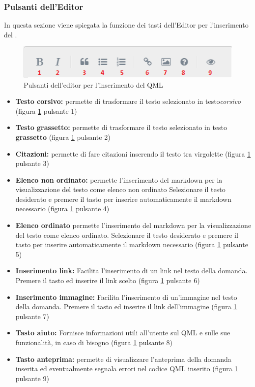\documentclass[12pt,a4paper]{article}
\begin{document}
	\subsubsection{Pulsanti dell'Editor}
	In questa sezione viene spiegata la funzione dei tasti dell'Editor per l'inserimento del .
	\begin{figure}[H]	
		\centering
		\includegraphics[width=\linewidth]{../img/screenshot/simpleMDEMenu.png}
		\caption{Pulsanti dell'editor per l'inserimento del QML}
		\label{simpleMDEEditor}
	\end{figure}
	\begin{itemize}
		
		\item \textbf{Testo corsivo:} permette di trasformare il testo selezionato in testo\textit{corsivo} (figura \ref{simpleMDEEditor} pulsante 1)
		\item \textbf{Testo grassetto:} permette di trasformare il testo selezionato in testo \textbf{grassetto} (figura \ref{simpleMDEEditor} pulsante 2)
		\item \textbf{Citazioni:} permette di fare citazioni inserendo il testo tra virgolette (figura \ref{simpleMDEEditor} pulsante 3)
		\item \textbf{Elenco non ordinato:} permette l'inserimento del markdown per la visualizzazione del testo come elenco non ordinato 
		Selezionare il testo desiderato e premere il tasto per inserire automaticamente il markdown necessario (figura \ref{simpleMDEEditor} pulsante 4) 
		\item \textbf{Elenco ordinato} permette l'inserimento del markdown per la visualizzazione del testo come elenco ordinato. 
		Selezionare il testo desiderato e premere il tasto per inserire automaticamente il markdown necessario (figura \ref{simpleMDEEditor} pulsante 5) 
		\item \textbf{Inserimento link:} Facilita l'inserimento di un link nel testo della domanda. Premere il tasto ed inserire il link scelto (figura \ref{simpleMDEEditor} pulsante 6)
		\item \textbf{Inserimento immagine:} Facilita l'inserimento di un'immagine nel testo della domanda. Premere il tasto ed inserire il link dell'immagine (figura \ref{simpleMDEEditor} pulsante 7) 
		\item \textbf{Tasto aiuto:} Fornisce informazioni utili all'utente sul QML e sulle sue funzionalità, in caso di bisogno (figura \ref{simpleMDEEditor} pulsante 8) 
		\item \textbf{Tasto anteprima:} permette di visualizzare l'anteprima della domanda inserita ed eventualmente segnala errori nel codice QML inserito (figura \ref{simpleMDEEditor} pulsante 9) 
	\end{itemize}
	
\end{document}
